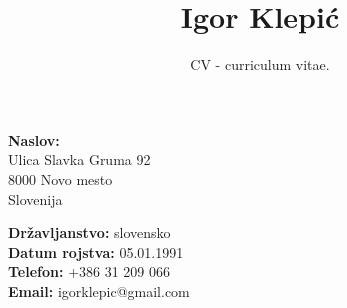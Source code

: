\documentclass[10pt]{article}
\title{\bfseries\huge Igor Klepić}
\author{CV - curriculum vitae.}
\date{}
\begin{document}
\maketitle
\vspace{1em}
\begin{minipage}[ht]{0.48\textwidth}
{\bf Naslov: } \\
Ulica Slavka Gruma 92\\
8000 Novo mesto\\
Slovenija
\end{minipage}
\begin{minipage}[ht]{0.48\textwidth}
{\bf Državljanstvo:} slovensko\\
{\bf Datum rojstva:} 05.01.1991\\
{\bf Telefon:} +386 31 209 066\\
{\bf Email:} igorklepic@gmail.com
\end{minipage}
\vspace{20pt}
 
 
\end{document}
